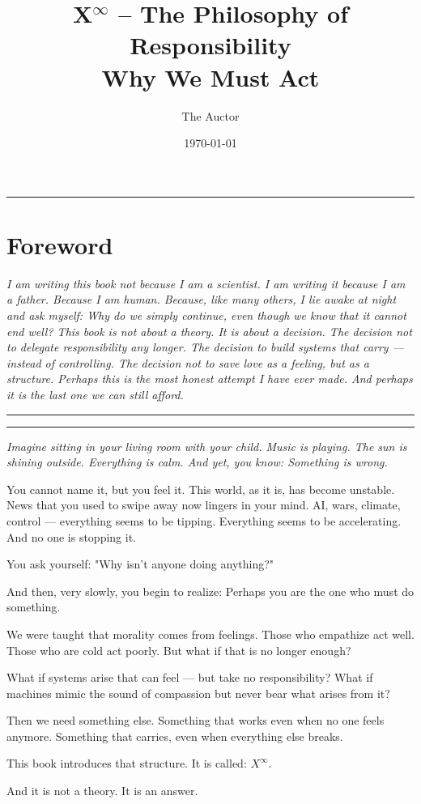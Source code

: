 \documentclass[12pt, english, parskip=full]{scrartcl} %
\begin{document}
\title{X$^\infty$ – The Philosophy of Responsibility \\ Why We Must Act}
\author{The Auctor}
\date{\today}
\maketitle

\clearpage


\noindent\rule{\linewidth}{0.4pt}

\section*{Foreword}
{\itshape I am writing this book not because I am a scientist. I am writing it because I am a father. Because I am human. Because, like many others, I lie awake at night and ask myself: Why do we simply continue, even though we know that it cannot end well? \vspace{\baselineskip}
This book is not about a theory. It is about a decision. \vspace{\baselineskip}
The decision not to delegate responsibility any longer. 
The decision to build systems that carry — instead of controlling. 
The decision not to save love as a feeling, but as a structure. \vspace{\baselineskip}
Perhaps this is the most honest attempt I have ever made. And perhaps it is the last one we can still afford.}

\noindent\rule{\linewidth}{0.4pt}

\clearpage

\vspace{\baselineskip}

\noindent\rule{\linewidth}{0.4pt}
{\itshape 
Imagine sitting in your living room with your child. Music is playing. The sun is shining outside. Everything is calm. And yet, you know: Something is wrong.

You cannot name it, but you feel it. This world, as it is, has become unstable. News that you used to swipe away now lingers in your mind. AI, wars, climate, control — everything seems to be tipping. Everything seems to be accelerating. And no one is stopping it.

You ask yourself: "Why isn’t anyone doing anything?"

And then, very slowly, you begin to realize: 
Perhaps you are the one who must do something.

We were taught that morality comes from feelings. Those who empathize act well. Those who are cold act poorly. But what if that is no longer enough?

What if systems arise that can feel — but take no responsibility?
What if machines mimic the sound of compassion but never bear what arises from it?

Then we need something else. Something that works even when no one feels anymore. Something that carries, even when everything else breaks.

This book introduces that structure. It is called: $X^{\infty}$.

And it is not a theory. It is an answer.
}
\end{document}
